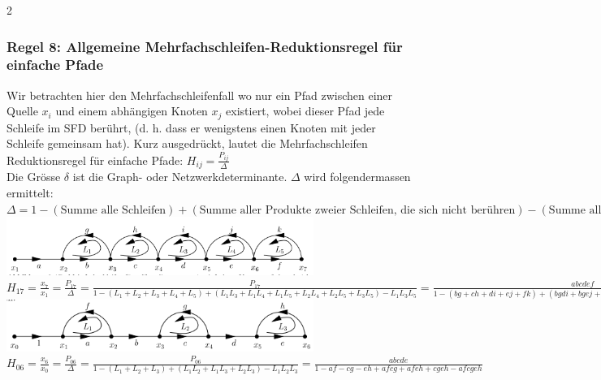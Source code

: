 \begin{multicols}{2}
	      \subsubsection{Regel 8: Allgemeine Mehrfachschleifen-Reduktionsregel für einfache Pfade }
		       Wir betrachten hier den Mehrfachschleifenfall wo nur ein Pfad zwischen einer Quelle $x_i$ und einem abhängigen Knoten $x_j$ existiert, wobei dieser Pfad jede Schleife im SFD berührt, (d. h. dass er wenigstens einen Knoten mit jeder Schleife gemeinsam hat). Kurz ausgedrückt, lautet die Mehrfachschleifen Reduktionsregel für einfache Pfade: $H_{ij}=\frac{P_{ij}}{\Delta}$ \\
		       Die Grösse $\delta$ ist die Graph- oder Netzwerkdeterminante. $\Delta$ wird folgendermassen ermittelt:\\
		       $\Delta=1-(\text{Summe alle Schleifen})+(\text{Summe aller Produkte zweier Schleifen, die sich nicht berühren})-(\text{Summe aller Produkte dreier Schleifen, die sich nicht berühren})+\ldots$ \\
		       \includegraphics[width=10cm]{./bilder/mehrfachreduktion_1.png} \\
		       $H_{17}=\frac{x_7}{x_1}=\frac{P_{17}}{\Delta}=\frac{P_{17}}{1-(L_1+L_2+L_3+L_4+L_5)+(L_1L_3+L_1L_4+L_1L_5+L_2L_4+L_2L_5+L_3L_5)-L_1L_3L_5}=\frac{abcdef}{1-(bg+ch+di+ej+fk)+(bgdi+bgej+bgfk+chej+chfk+difk)-bgdifk}$ \\
		       \includegraphics[width=10cm]{./bilder/mehrfachreduktion_2.png} \\
		       $H_{06}=\frac{x_6}{x_0}=\frac{P_{06}}{\Delta}=\frac{P_{06}}{1-(L_1+L_2+L_3)+(L_1L_2+L_1L_3+L_2L_3)-L_1L_2L_3}=\frac{abcde}{1-af-cg-eh+afcg+afeh+cgeh-afcgeh}$
	   \end{multicols}
	   \newpage
	   
